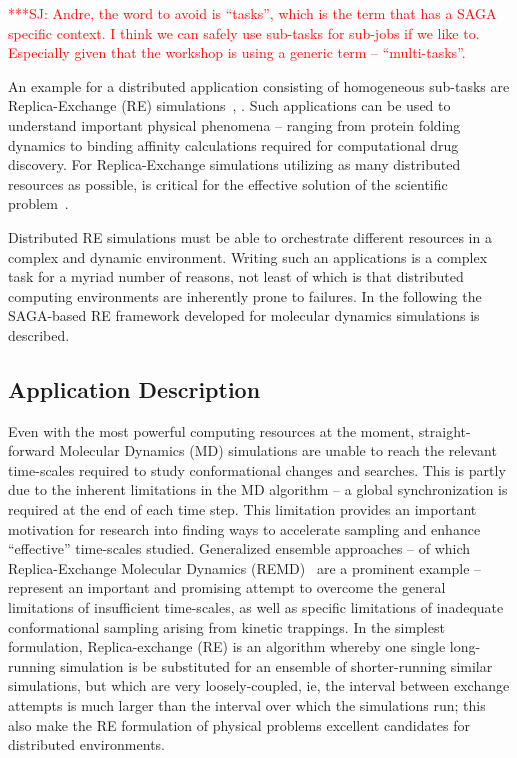\documentclass[conference,final]{IEEEtran}
\newcommand{\up}{\vspace*{-1em}}
\newcommand{\jhanote}[1]{ {\textcolor{red} { ***SJ: #1 }}}
\newcommand{\jhanote}[1]{}
\begin{document}
\jhanote{Andre, the word to avoid is ``tasks'', which is the term that
  has a SAGA specific context. I think we can safely use sub-tasks for
  sub-jobs if we like to. Especially given that the workshop is using
  a generic term -- ``multi-tasks''.}

An example for a distributed application consisting of homogeneous
sub-tasks are Replica-Exchange (RE) simulations~\cite{Sugita:1999rm},
\cite{hansmann}. Such applications can be used to understand important
physical phenomena -- ranging from protein folding dynamics to binding
affinity calculations required for computational drug discovery.  For
Replica-Exchange simulations utilizing as many distributed resources
as possible, is critical for the effective solution of the scientific
problem~\cite{repex_ptrsa}.

Distributed RE simulations must be able to orchestrate different
resources in a complex and dynamic environment.  Writing such an
applications is a complex task for a myriad number of reasons, not
least of which is that distributed computing environments are
inherently prone to failures. In the following the SAGA-based RE
framework developed for molecular dynamics simulations is described.

\up

\subsection{Application Description}

\up


Even with the most powerful computing resources at the moment,
straight-forward Molecular Dynamics (MD) simulations are unable to
reach the relevant time-scales required to study conformational
changes and searches. This is partly due to the inherent limitations
in the MD algorithm -- a global synchronization is required at the end
of each time step.  This limitation provides an important motivation
for research into finding ways to accelerate sampling and enhance
``effective'' time-scales studied. Generalized ensemble approaches --
of which Replica-Exchange Molecular Dynamics
(REMD)~\cite{Sugita:1999rm} are a prominent example -- represent an
important and promising attempt to overcome the general limitations of
insufficient time-scales, as well as specific limitations of
inadequate conformational sampling arising from kinetic trappings.  In
the simplest formulation, Replica-exchange (RE) is an algorithm whereby one
single long-running simulation is be substituted for an ensemble of
shorter-running similar simulations, but which are very
loosely-coupled, ie, the interval between exchange attempts is much
larger than the interval over which the simulations run; this also
make the RE formulation of physical problems excellent
candidates for distributed environments.
\end{document}
